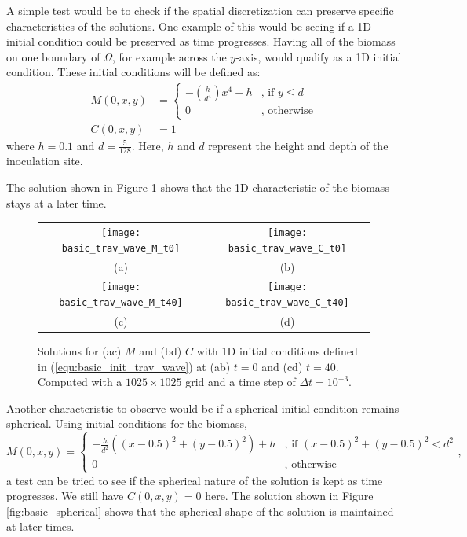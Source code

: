 A simple test would be to check if the spatial discretization can preserve specific characteristics of the solutions.
One example of this would be seeing if a 1D initial condition could be preserved as time progresses.
Having all of the biomass on one boundary of $\Omega$, for example across the $y$-axis, would qualify as a 1D initial condition.
These initial conditions will be defined as:
\begin{equation} \label{equ:basic_init_trav_wave}
  \begin{aligned}
  M(0,x,y) &= \begin{cases}
    -\left( \frac{h}{d^4} \right) x^4 + h & \text{, if } y \le d \\
    0 & \text{, otherwise}
  \end{cases} \\
  C(0,x,y) &= 1
  \end{aligned}
\end{equation}
where $h = 0.1$ and $d = \frac{5}{128}$.
Here, $h$ and $d$ represent the height and depth of the inoculation site. 

The solution shown in Figure \ref{fig:basic_trav} shows that the 1D characteristic of the biomass stays at a later time. 

\begin{figure}
  \centering
  \begin{tabular}{c c}
    \texttt{[image: basic\_trav\_wave\_M\_t0]} & 
    \texttt{[image: basic\_trav\_wave\_C\_t0]} \\
    (a) & (b) \\
    \texttt{[image: basic\_trav\_wave\_M\_t40]} &
    \texttt{[image: basic\_trav\_wave\_C\_t40]}\\
    (c) & (d)
  \end{tabular}
  \caption{Solutions for (ac) $M$ and (bd) $C$ with 1D initial conditions defined in (\ref{equ:basic_init_trav_wave}) at (ab) $t = 0$ and (cd) $t = 40$. Computed with a $1025 \times 1025$ grid and a time step of $\Delta t = 10^{-3}$.}
  \label{fig:basic_trav}
\end{figure}

Another characteristic to observe would be if a spherical initial condition remains spherical.
Using initial conditions for the biomass,
\begin{equation} \label{equ:basic_spherical}
  M(0,x,y) = \begin{cases}
    - \frac{h}{d^2} \left( (x - 0.5)^2 + (y - 0.5)^2 \right) + h  & \text{, if } (x - 0.5)^2 + (y - 0.5)^2 < d^2 \\
    0 & \text{, otherwise}
  \end{cases},
\end{equation}
a test can be tried to see if the spherical nature of the solution is kept as time progresses.
We still have $C(0,x,y) = 0$ here.
The solution shown in Figure \ref{fig:basic_spherical} shows that the spherical shape of the solution is maintained at later times.

